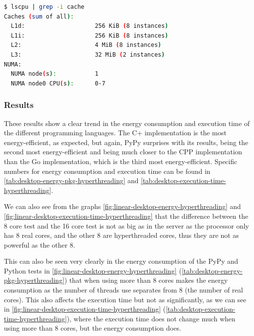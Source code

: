 \begin{lstlisting}[language=bash, caption={Cache of the AMD Ryzen 3800x}, label={lst:ryzen-cache}]
$ lscpu | grep -i cache
Caches (sum of all):
  L1d:                    256 KiB (8 instances)
  L1i:                    256 KiB (8 instances)
  L2:                     4 MiB (8 instances)
  L3:                     32 MiB (2 instances)
NUMA:
  NUMA node(s):           1
  NUMA node0 CPU(s):      0-7
\end{lstlisting}


\subsubsection{Results}






These results show a clear trend in the energy consumption and execution time of the different programming languages. The C\++ implementation is the most energy-efficient, as expected, but again, PyPy surprises with its results, being the second most energy-efficient and being much closer to the \gls{CPP} implementation than the Go implementation, which is the third most energy-efficient. Specific numbers for energy consumption and execution time can be found in \autoref{tab:desktop-energy-pkg-hyperthreading} and \autoref{tab:desktop-execution-time-hyperthreading}.

We can also see from the graphs \autoref{fig:linear-desktop-energy-hyperthreading} and \autoref{fig:linear-desktop-execution-time-hyperthreading} that the difference between the 8 core test and the 16 core test is not as big as in the server as the processor only has 8 real cores, and the other 8 are hyperthreaded cores, thus they are not as powerful as the other 8. 

This can also be seen very clearly in the energy consumption of the PyPy and Python tests in \autoref{fig:linear-desktop-energy-hyperthreading} (\autoref{tab:desktop-energy-pkg-hyperthreading}) that when using more than 8 cores makes the energy consumption as the number of threads use separates from 8 (the number of real cores). This also affects the execution time but not as significantly, as we can see in \autoref{fig:linear-desktop-execution-time-hyperthreading} (\autoref{tab:desktop-execution-time-hyperthreading}), where the execution time does not change much when using more than 8 cores, but the energy consumption does.

